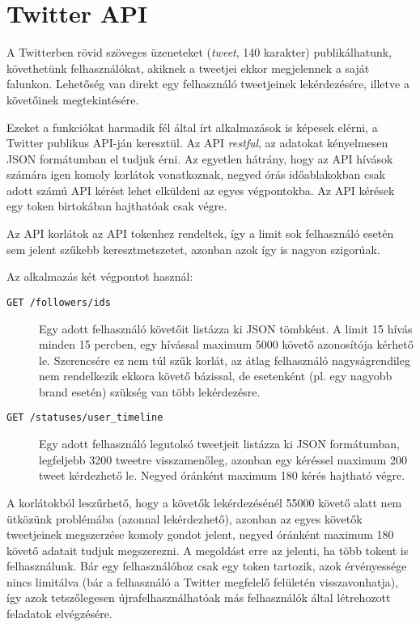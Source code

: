 \section{Twitter API}

A Twitterben rövid szöveges üzeneteket (\emph{tweet}, 140 karakter)
publikálhatunk, követhetünk felhasználókat, akiknek a tweetjei ekkor
megjelennek a saját falunkon.
Lehetőség van direkt egy felhasználó tweetjeinek lekérdezésére,
illetve a követőinek megtekintésére.

Ezeket a funkciókat harmadik fél által írt alkalmazások is képesek elérni,
a Twitter publikus API-ján keresztül.
Az API \emph{restful}, az adatokat kényelmesen JSON formátumban el tudjuk érni.
Az egyetlen hátrány, hogy az API hívások számára igen komoly korlátok
vonatkoznak, negyed órás időablakokban csak adott számú API kérést lehet
elküldeni az egyes végpontokba. Az API kérések egy token birtokában hajthatóak
csak végre.

Az API korlátok az API tokenhez rendeltek, így a limit sok felhasználó
esetén sem jelent szűkebb keresztmetszetet, azonban azok így is
nagyon szigorúak.

Az alkalmazás két végpontot használ:

\begin{description}
  \item[\texttt{GET /followers/ids}] Egy adott felhasználó követőit listázza
    ki JSON tömbként. A limit 15 hívás minden 15 percben, egy hívással
    maximum 5000 követő azonosítója kérhető le. Szerencsére ez nem túl szűk
    korlát, az átlag felhasználó nagyságrendileg nem rendelkezik ekkora
    követő bázissal, de esetenként (pl. egy nagyobb brand esetén) szükség van
    több lekérdezésre.
  \item[\texttt{GET /statuses/user\_timeline}] Egy adott felhasználó legutolsó
    tweetjeit listázza ki JSON formátumban, legfeljebb 3200 tweetre
    visszamenőleg, azonban egy kéréssel maximum 200 tweet kérdezhető le.
    Negyed óránként maximum 180 kérés hajtható végre.
\end{description}

A korlátokból leszűrhető, hogy a követők lekérdezésénél 55000 követő alatt
nem ütközünk problémába (azonnal lekérdezhető), azonban az egyes követők
tweetjeinek megszerzése komoly gondot jelent, negyed óránként maximum
180 követő adatait tudjuk megszerezni. A megoldást erre az jelenti,
ha több tokent is felhasználunk. Bár egy felhasználóhoz csak egy token
tartozik, azok érvényessége nincs limitálva (bár a felhasználó
a Twitter megfelelő felületén visszavonhatja), így azok tetszőlegesen
újrafelhasználhatóak más felhasználók által létrehozott feladatok elvégzésére.

